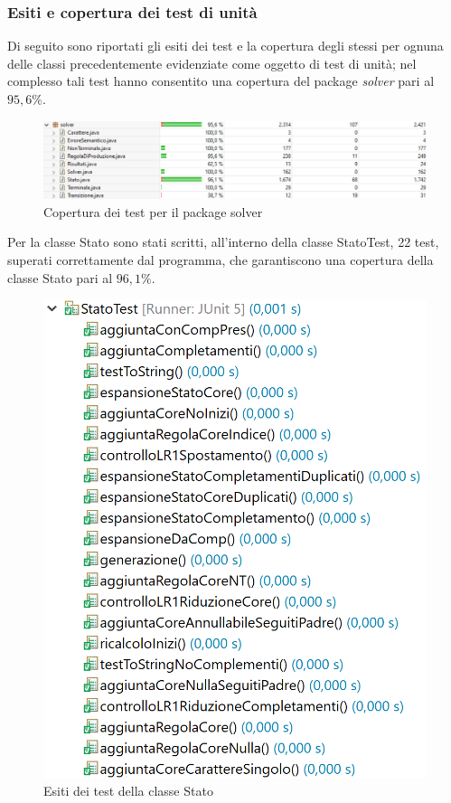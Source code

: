\documentclass[12pt]{article}
\newcounter{subsubsubsection}[subsubsection]
\begin{document}
\subsubsection{Esiti e copertura dei test di unità}
Di seguito sono riportati gli esiti dei test e la copertura degli stessi per ognuna delle classi precedentemente evidenziate come oggetto di test di unità; nel complesso tali test hanno consentito una copertura del package \textit{solver} pari al $95,6\%$.
\begin{figure}[h]
\centering
\includegraphics[width=\textwidth]{immagini/SolverCoverage.png}
\caption{Copertura dei test per il package solver}
\end{figure}
Per la classe Stato sono stati scritti, all'interno della classe StatoTest, 22 test, superati correttamente dal programma, che garantiscono una copertura della classe Stato pari al $96,1\%$.
\begin{figure}[h]
\centering
\includegraphics[scale=0.4]{immagini/esitiStatoTest.png}
\caption{Esiti dei test della classe Stato}
\end{figure}
\end{document}
